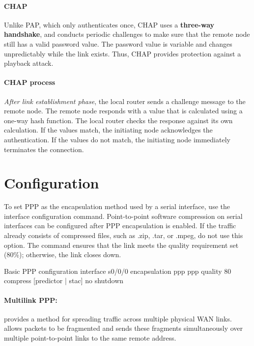 \paragraph{CHAP}Unlike PAP, which only authenticates once, CHAP uses a \textbf{three-way handshake}, and conducts periodic challenges to make sure that the remote node still has a valid password value. The password value is variable and changes unpredictably while the link exists. Thus, CHAP provides protection against a playback attack.

\paragraph{CHAP process}\emph{After link establishment phase}, the local router sends a challenge message to the remote node. The remote node responds with a value that is calculated using a one-way hash function. The local router checks the response against its own calculation. If the values match, the initiating node acknowledges the authentication. If the values do not match, the initiating node immediately terminates the connection.

\section{Configuration}

To set PPP as the encapsulation method used by a serial interface, use the  interface configuration command. Point-to-point software compression on serial interfaces can be configured after PPP encapsulation is enabled. If the traffic already consists of compressed files, such as .zip, .tar, or .mpeg, do not use this option. The  command ensures that the link meets the quality requirement set (80\%); otherwise, the link closes down.

\begin{sexylisting}{Basic PPP configuration}
interface s0/0/0
  encapsulation ppp
  ppp quality 80
  compress [predictor | stac]
  no shutdown
\end{sexylisting}
	
\paragraph{Multilink PPP:} provides a method for spreading traffic across multiple physical WAN links. allows packets to be fragmented and sends these fragments simultaneously over multiple point-to-point links to the same remote address. 

